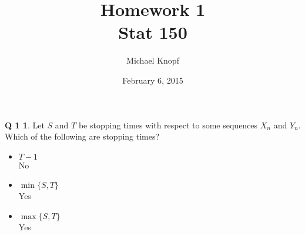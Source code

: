 \documentclass[12pt]{article}
\theoremstyle{definition}
\newtheorem*{prob1}{Q 1}
\begin{document}
\title{Homework 1 \\ Stat 150}
\author{Michael Knopf}
\date{February 6, 2015}
\maketitle


\begin{prob1}
Let $S$ and $T$ be stopping times with respect to some sequences $X_n$ and $Y_n$.  Which of the following are stopping times?
\begin{itemize}
\item $T - 1$ \\ No
\item $\min\{S,T\}$ \\ Yes
\item $\max\{S,T\}$ \\ Yes
\end{itemize}
\end{prob1}
\end{document}
